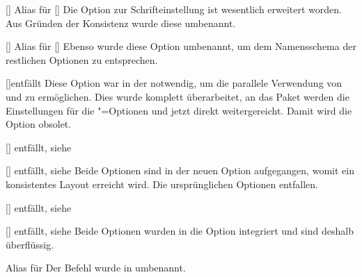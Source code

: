 \documentclass[%
  english,ngerman,%
  headings=optiontoheadandtoc,captions=tableheading,numbers=noenddot,%
  chapterpage,cdfoot,%
]{tudscrman}
\begin{document}
\begin{Declaration}{[\PBoolean]}{%
  Alias für [\PSet]%
}
\printdeclarationlist*%
%
Die Option zur Schrifteinstellung ist wesentlich erweitert worden. Aus Gründen 
der Konsistenz wurde diese umbenannt.
\end{Declaration}

\begin{Declaration}{[\PBoolean]}{%
  Alias für [\PBoolean]%
}
\printdeclarationlist*%
%
Ebenso wurde diese Option umbenannt, um dem Namensschema der restlichen Optionen 
zu entsprechen.
\end{Declaration}

\begin{Declaration}{[\PSet]}{entfällt}
\printdeclarationlist*%
%
Diese Option war in der \vTUD notwendig, um die parallele Verwendung von 
 und  zu ermöglichen. Dies wurde komplett 
überarbeitet, an das Paket  werden die Einstellungen für die 
\KOMAScript"=Optionen  und  jetzt 
direkt weitergereicht. Damit wird die Option  obsolet.
\end{Declaration}

\begin{Declaration}{[\PBoolean]}{%
  entfällt, siehe %
}
\begin{Declaration}{[\PBoolean]}{%
  entfällt, siehe %
}
\printdeclarationlist*%
%
Beide Optionen sind in der neuen Option  
aufgegangen, womit ein konsistentes Layout erreicht wird. Die ursprünglichen 
Optionen entfallen. 
\end{Declaration}
\end{Declaration}

\begin{Declaration}{[\PBoolean]}{%
  entfällt, siehe %
}
\begin{Declaration}{[\PBoolean]}{%
  entfällt, siehe %
}
\printdeclarationlist*%
%
Beide Optionen wurden in die Option  integriert und sind 
deshalb überflüssig.
\end{Declaration}
\end{Declaration}

\begin{Declaration}{}%
  {Alias für %
}
\printdeclarationlist*%
%
Der Befehl  wurde in  umbenannt.
\end{Declaration}
\end{document}

